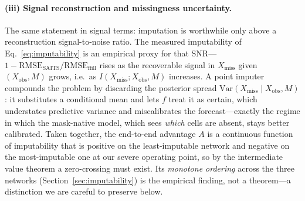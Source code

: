 \documentclass[review,3p,times]{elsarticle}
\begin{document}
\paragraph{(iii) Signal reconstruction and missingness uncertainty.}
The same statement in signal terms: imputation is worthwhile only above a
reconstruction signal-to-noise ratio. The measured imputability of
Eq.~\eqref{eq:imputability} is an empirical proxy for that
SNR---$1-\mathrm{RMSE_{SAITS}}/\mathrm{RMSE_{ffill}}$ rises as the recoverable
signal in $X_{\mathrm{miss}}$ given $(X_{\mathrm{obs}},M)$ grows, i.e.\ as
$I(X_{\mathrm{miss}};X_{\mathrm{obs}},M)$ increases. A point imputer compounds the
problem by discarding the posterior spread
$\mathrm{Var}(X_{\mathrm{miss}}\mid X_{\mathrm{obs}},M)$: it substitutes a
conditional mean and lets $f$ treat it as certain, which understates predictive
variance and miscalibrates the forecast---exactly the regime in which the
mask-native model, which sees \emph{which} cells are absent, stays better
calibrated. Taken together, the end-to-end advantage $A$ is a continuous function
of imputability that is positive on the least-imputable network and negative on
the most-imputable one at our severe operating point, so by the intermediate
value theorem a zero-crossing must exist. Its \emph{monotone ordering} across the
three networks (Section~\ref{sec:imputability}) is the empirical finding, not a
theorem---a distinction we are careful to preserve below.
\end{document}
